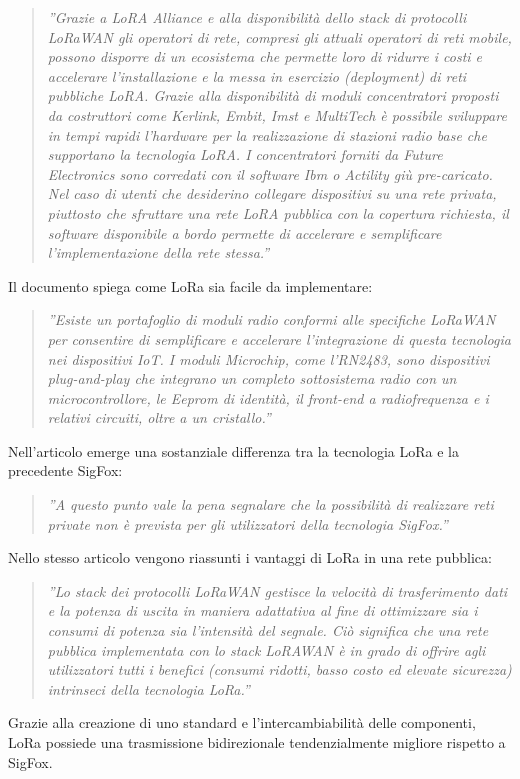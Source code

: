 \documentclass[a4paper]{report} %
\begin{document}
\begin{quote}	
	\textit{''Grazie a LoRA Alliance e alla disponibilità dello stack di protocolli LoRaWAN gli operatori di rete, compresi gli attuali operatori di reti mobile, possono disporre di un ecosistema che permette loro di ridurre i costi e accelerare l'installazione e la messa in esercizio (deployment) di reti pubbliche LoRA. Grazie alla disponibilità di moduli concentratori proposti da costruttori come Kerlink, Embit, Imst e MultiTech è possibile sviluppare in tempi rapidi l'hardware per la realizzazione di stazioni radio base che supportano la tecnologia LoRA. I concentratori forniti da Future Electronics sono corredati con il software Ibm o Actility giù pre-caricato. Nel caso di utenti che desiderino collegare dispositivi su una rete privata, piuttosto che sfruttare una rete LoRA pubblica con la copertura richiesta, il software disponibile a bordo permette di accelerare e semplificare l'implementazione della rete stessa.''} 
\end{quote}
Il documento \cite{art:rif.20} spiega come LoRa sia facile da implementare:
\begin{quote}
	\textit{''Esiste un portafoglio di moduli radio conformi alle specifiche LoRaWAN per consentire di semplificare e accelerare l'integrazione di questa tecnologia nei dispositivi IoT. I moduli Microchip, come l'RN2483, sono dispositivi plug-and-play che integrano un completo sottosistema radio con un microcontrollore, le Eeprom di identità, il front-end a radiofrequenza e i relativi circuiti, oltre a un cristallo.''}
\end{quote}
Nell'articolo \cite{art:rif.23} emerge una sostanziale differenza tra la tecnologia LoRa e la precedente SigFox:
\begin{quote}	
	\textit{''A questo punto vale la pena segnalare che la possibilità di realizzare reti private non è prevista per gli utilizzatori della tecnologia SigFox.''} 
\end{quote}	
Nello stesso articolo vengono riassunti i vantaggi di LoRa in una rete pubblica:
\begin{quote}	
	\textit{''Lo stack dei protocolli LoRaWAN gestisce la velocità di trasferimento dati e la potenza di uscita in maniera adattativa al fine di ottimizzare sia i consumi di potenza sia l'intensità del segnale. Ciò significa che una rete pubblica implementata con lo stack LoRAWAN è in grado di offrire agli utilizzatori tutti i benefici (consumi ridotti, basso costo ed elevate sicurezza) intrinseci della tecnologia LoRa.''}
\end{quote}
Grazie alla creazione di uno standard e l'intercambiabilità delle componenti, LoRa possiede una trasmissione bidirezionale tendenzialmente migliore rispetto a SigFox.
\end{document}
